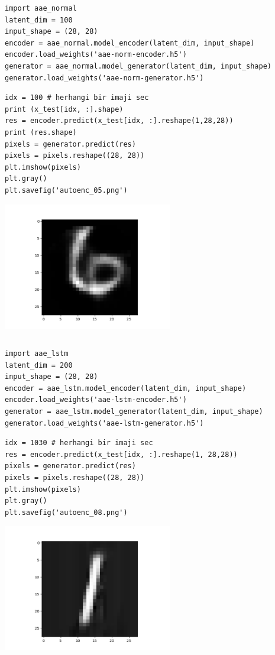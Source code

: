 \documentclass[12pt,fleqn]{article}\usepackage{../../common}
\begin{document}
\inputminted[fontsize=\footnotesize]{python}{aae_normal.py}

\begin{verbatim}
import aae_normal
latent_dim = 100
input_shape = (28, 28)
encoder = aae_normal.model_encoder(latent_dim, input_shape)
encoder.load_weights('aae-norm-encoder.h5')
generator = aae_normal.model_generator(latent_dim, input_shape)
generator.load_weights('aae-norm-generator.h5')
\end{verbatim}

\begin{verbatim}
idx = 100 # herhangi bir imaji sec
print (x_test[idx, :].shape)
res = encoder.predict(x_test[idx, :].reshape(1,28,28))
print (res.shape)
pixels = generator.predict(res)
pixels = pixels.reshape((28, 28))
plt.imshow(pixels)
plt.gray()
plt.savefig('autoenc_05.png')
\end{verbatim}

\includegraphics[width=20em]{autoenc_05.png}

\inputminted[fontsize=\footnotesize]{python}{aae_lstm.py}

\begin{verbatim}
import aae_lstm
latent_dim = 200
input_shape = (28, 28)
encoder = aae_lstm.model_encoder(latent_dim, input_shape)
encoder.load_weights('aae-lstm-encoder.h5')
generator = aae_lstm.model_generator(latent_dim, input_shape)
generator.load_weights('aae-lstm-generator.h5')
\end{verbatim}

\begin{verbatim}
idx = 1030 # herhangi bir imaji sec
res = encoder.predict(x_test[idx, :].reshape(1, 28,28))
pixels = generator.predict(res)
pixels = pixels.reshape((28, 28))
plt.imshow(pixels)
plt.gray()
plt.savefig('autoenc_08.png')
\end{verbatim}

\includegraphics[width=20em]{autoenc_08.png}
\end{document}
